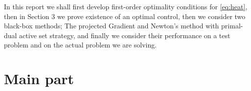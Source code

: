 \documentclass{article}
\begin{document}
In this report we shall first develop first-order optimality conditions for \eqref{eq:heat}, then in Section 3 we prove existence of an optimal control, then we consider two black-box methods; The projected Gradient and Newton's method with primal-dual active set strategy, and finally we consider their performance on a test problem and on the actual problem we are solving. 

\section{Main part}








\printbibliography
% 
%   
\end{document}
